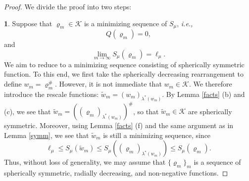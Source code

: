 \documentclass[reqno,11pt]{amsart}
\numberwithin{equation}{section}
\theoremstyle{definition}
\begin{document}
\begin{proof} We divide the proof into two steps:

\medskip
\noindent
{\bf 1}. Suppose that $\varrho_m \in \mathcal{K}$ is a minimizing sequence of $S_\mu$, {\it i.e.,} 
    \[
    Q(\varrho_m) = 0,
    \]
    and
    \[
    \lim_{m \to \infty} S_{\mu}(\varrho_m) = \ell_\mu.
    \]
 We aim to reduce to a minimizing sequence consisting of spherically symmetric function. 
 To this end, we first take the spherically decreasing rearrangement to define $w_m = \varrho_m^\#$. 
 However, it is not immediate that $w_m \in \mathcal{K}$.
 We therefore introduce the rescale functions:
 $\tilde{w}_m = (w_m)_{\lambda^*(w_m)}$. 
 By Lemma \ref{facts} (b) and (c), 
we see that $\tilde{w}_m = ((\varrho_m)_{\lambda^*(w_m)})^\#$, so that
$\tilde{w}_m \in \mathcal{K}$ are spherically symmetric. 
Moreover, using Lemma \ref{facts} (f) and the same argument as in Lemma \ref{symm}, 
we see that $\tilde{w}_m$ is still a minimizing sequence, since
    \[
    \ell_\mu \leq S_\mu(\tilde{w}_m) \leq S_\mu((\varrho_m)_{\lambda^*(w_m)}) \leq S_\mu(\varrho_m).
    \]
Thus, without loss of generality, we may assume that $\{\varrho_m\}_m$ is a sequence of spherically symmetric, radially decreasing, and non-negative functions. 


\end{proof}
\end{document}
